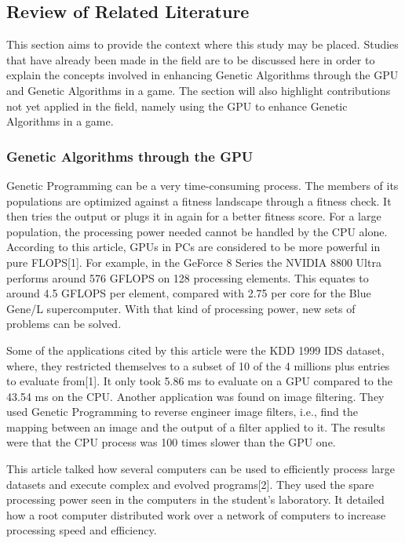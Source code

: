 \subsection*{Review of Related Literature}
	This section aims to provide the context where this study may be placed. 
	Studies that have already been made in the field are to be discussed here in order to 
	explain the concepts involved in enhancing Genetic Algorithms through the GPU and 
	Genetic Algorithms in a game. The section will also highlight contributions not yet 
	applied in the field, namely using the GPU to enhance Genetic Algorithms in a game.

	
\subsubsection*{Genetic Algorithms through the GPU}

	Genetic Programming can be a very time-consuming process.  The members of its populations are optimized against a fitness landscape through a fitness check.  
	It then tries the output or plugs it in again for a better fitness score. For a large population, the processing power needed cannot be handled by the CPU alone.  
	According to this article, GPUs in PCs are considered to be more powerful in pure FLOPS[1].  For example, in the GeForce 8 Series the NVIDIA 8800 Ultra performs around 576 GFLOPS 
	on 128 processing elements.  This equates to around 4.5 GFLOPS per element, compared with 2.75 per core for the Blue Gene/L supercomputer.  With that kind of processing power, 
	new sets of problems can be solved.  

	Some of the applications cited by this article were the KDD 1999 IDS dataset, where, they restricted themselves to a subset of 10%
	of the 4 millions plus entries to evaluate from[1].  It only took 5.86 ms to evaluate on a GPU compared to the 43.54 ms on the CPU.  Another application was found on image filtering.  
	They used Genetic Programming to reverse engineer image filters, i.e., find the mapping between an image and the output of a filter applied to it.  The results were that the CPU process 
	was 100 times slower than the GPU one.  

	This article talked how several computers can be used to efficiently process large datasets and execute complex and evolved programs[2].  
	They used the spare processing power seen in the computers in the student's laboratory.  It detailed how a root computer distributed work over a network of computers to increase processing speed and efficiency.
	
